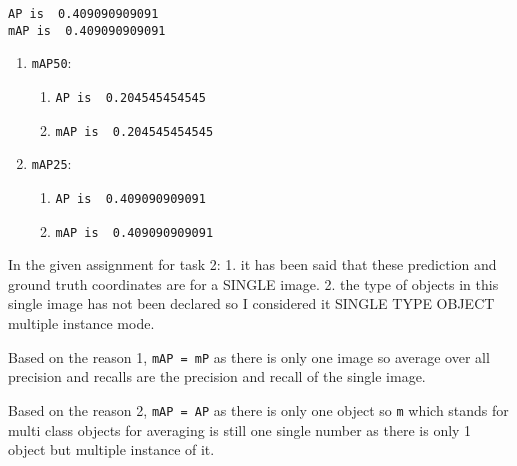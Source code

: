 \documentclass[11pt]{article}
\providecommand{\tightlist}{%
      \setlength{\itemsep}{0pt}\setlength{\parskip}{0pt}}
\begin{document}
    \begin{Verbatim}[commandchars=\\\{\}]
AP is  0.409090909091
mAP is  0.409090909091

    \end{Verbatim}

    \begin{enumerate}
\def\labelenumi{\arabic{enumi}.}
\tightlist
\item
  \texttt{mAP50}:

  \begin{enumerate}
  \def\labelenumii{\arabic{enumii}.}
  \tightlist
  \item
    \texttt{AP\ is\ \ 0.204545454545}
  \item
    \texttt{mAP\ is\ \ 0.204545454545}
  \end{enumerate}
\item
  \texttt{mAP25}:

  \begin{enumerate}
  \def\labelenumii{\arabic{enumii}.}
  \tightlist
  \item
    \texttt{AP\ is\ \ 0.409090909091}
  \item
    \texttt{mAP\ is\ \ 0.409090909091}
  \end{enumerate}
\end{enumerate}

    In the given assignment for task 2: 1. it has been said that these
prediction and ground truth coordinates are for a SINGLE image. 2. the
type of objects in this single image has not been declared so I
considered it SINGLE TYPE OBJECT multiple instance mode.

Based on the reason 1, \texttt{mAP\ =\ mP} as there is only one image so
average over all precision and recalls are the precision and recall of
the single image.

Based on the reason 2, \texttt{mAP\ =\ AP} as there is only one object
so \texttt{m} which stands for multi class objects for averaging is
still one single number as there is only 1 object but multiple instance
of it.


    
    
    
    
\end{document}
